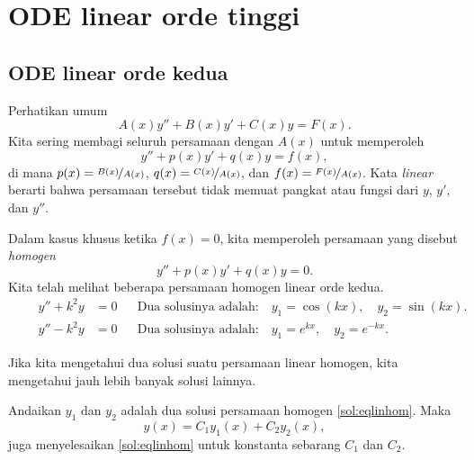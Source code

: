 \chapter{ODE linear orde tinggi} \label{ho:chapter}


\section{ODE linear orde kedua}
\label{solinear:section}


Perhatikan \emph{} umum
\begin{equation*}
A(x) y'' + B(x)y' + C(x)y = F(x) .
\end{equation*}
Kita sering membagi seluruh persamaan dengan $A(x)$ untuk memperoleh
\begin{equation} \label{sol:eqlin}
y'' + p(x)y' + q(x)y = f(x) ,
\end{equation}
di mana $p(x) = \nicefrac{B(x)}{A(x)}$, $q(x) = \nicefrac{C(x)}{A(x)}$, dan
$f(x) = \nicefrac{F(x)}{A(x)}$.
Kata \emph{linear} berarti bahwa persamaan tersebut tidak memuat pangkat atau
fungsi dari $y$, $y'$, dan $y''$.

Dalam kasus khusus ketika $f(x) = 0$, kita memperoleh persamaan yang disebut
\emph{homogen}
\begin{equation} \label{sol:eqlinhom}
y'' + p(x)y' + q(x)y = 0 .
\end{equation}
Kita telah melihat beberapa persamaan homogen linear orde kedua.
\begin{align*}
\qquad y'' + k^2 y & = 0 &
& \text{Dua solusinya adalah:} \quad y_1 = \cos (kx), \quad y_2 = \sin(kx) . \qquad \\
\qquad y'' - k^2 y & = 0 &
& \text{Dua solusinya adalah:} \quad y_1 = e^{kx}, \quad y_2 = e^{-kx} . \qquad
\end{align*}

Jika kita mengetahui dua solusi suatu persamaan linear homogen, kita mengetahui jauh lebih banyak solusi lainnya.

\begin{theorem}[Superposisi]
Andaikan $y_1$ dan $y_2$ adalah dua solusi persamaan homogen \eqref{sol:eqlinhom}. Maka
\begin{equation*}
y(x) = C_1 y_1(x) + C_2 y_2(x) ,
\end{equation*}
juga menyelesaikan \eqref{sol:eqlinhom} untuk konstanta sebarang $C_1$ dan $C_2$.
\end{theorem}


